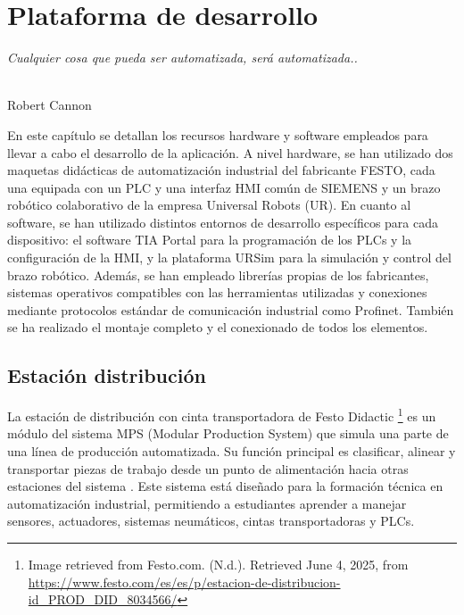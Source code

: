 \chapter{Plataforma de desarrollo}
\label{cap:capitulo3}

\begin{flushright}
\begin{minipage}[]{10cm}
\emph{Cualquier cosa que pueda ser automatizada, será automatizada..}\\
\end{minipage}\\

Robert Cannon\\
\end{flushright}

\vspace{1cm}

En este capítulo se detallan los recursos hardware y software empleados para llevar a cabo el desarrollo de la aplicación. A nivel hardware, se han utilizado dos maquetas didácticas de automatización industrial del fabricante FESTO, cada una equipada con un PLC y una interfaz HMI común de SIEMENS y un brazo robótico colaborativo de la empresa Universal Robots (UR). En cuanto al software, se han utilizado distintos entornos de desarrollo específicos para cada dispositivo: el software TIA Portal para la programación de los PLCs y la configuración de la HMI, y la plataforma URSim para la simulación y control del brazo robótico. Además, se han empleado librerías propias de los fabricantes, sistemas operativos compatibles con las herramientas utilizadas y conexiones mediante protocolos estándar de comunicación industrial como Profinet. También se ha realizado el montaje completo y el conexionado de todos los elementos.

\section{Estación distribución}
\label{sec:estacion_distribucion}

La estación de distribución con cinta transportadora de Festo Didactic \footnote{Image retrieved from Festo.com. (N.d.). Retrieved June 4, 2025, from \url{https://www.festo.com/es/es/p/estacion-de-distribucion-id_PROD_DID_8034566/}} es un módulo del sistema MPS (Modular Production System) que simula una parte de una línea de producción automatizada. Su función principal es clasificar, alinear y transportar piezas de trabajo desde un punto de alimentación hacia otras estaciones del sistema \cite{estacion_distribucion}. Este sistema está diseñado para la formación técnica en automatización industrial, permitiendo a estudiantes aprender a manejar sensores, actuadores, sistemas neumáticos, cintas transportadoras y PLCs. \\

